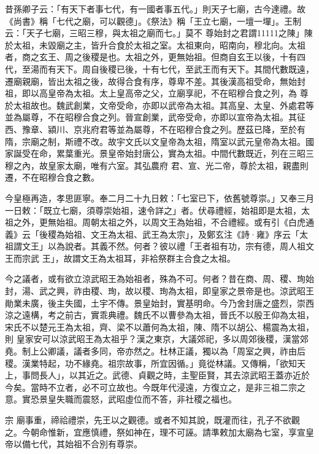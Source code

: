 \begin{pinyinscope}
 昔孫卿子云：「有天下者事七代，有一國者事五代。」則天子七廟，古今達禮。故《尚書》稱「七代之廟，可以觀德」。《祭法》稱「王立七廟，一壇一墠」。王制云：「天子七廟，三昭三穆，與太祖之廟而七。」莫不
 尊始封之君謂11111之陳」陳於太祖，未毀廟之主，皆升合食於太祖之室。太祖東向，昭南向，穆北向。太祖者，商之玄王、周之後稷是也。太祖之外，更無始祖。但商自玄王以後，十有四代，至湯而有天下。周自後稷已後，十有七代，至武王而有天下。其間代數既遠，遷廟親廟，皆出太祖之後，故得合食有序，尊卑不差。其後漢高祖受命，無始封祖，即以高皇帝為太祖。太上皇高帝之父，立廟享祀，不在昭穆合食之列，為
 尊於太祖故也。魏武創業，文帝受命，亦即以武帝為太祖。其高皇、太皇、外處君等並為屬尊，不在昭穆合食之列。晉宣創業，武帝受命，亦即以宣帝為太祖。其征西、豫章、潁川、京兆府君等並為屬尊，不在昭穆合食之列。歷茲已降，至於有隋，宗廟之制，斯禮不改。故宇文氏以文皇帝為太祖，隋室以武元皇帝為太祖。國家誕受在命，累葉重光。景皇帝始封唐公，實為太祖。中間代數既近，列在三昭三穆之內，故皇家太廟，唯有六室。其弘農府
 君、宣、光二帝，尊於太祖，親盡則遷，不在昭穆合食之數。



 今皇極再造，孝思匪寧。奉二月二十九日敕：「七室已下，依舊號尊崇。」又奉三月一日敕：「既立七廟，須尊崇始祖，速令詳之」者。伏尋禮經，始祖即是太祖，太祖之外，更無始祖。周朝太祖之外，以周文王為始祖，不合禮經。或有引《白虎通義》云「後稷為始祖、文王為太祖、武王為太宗」，及鄭玄注《詩·雍》序云「太祖謂文王」以為說者。其義不然。何者？彼以禮「王者祖有功，宗有德，周人祖文王而宗武
 王」，故謂文王為太祖耳，非袷祭群主合食之太祖。



 今之議者，或有欲立涼武昭王為始祖者，殊為不可。何者？昔在商、周、稷、珣始封，湯、武之興，祚由稷、珣，故以稷、珣為太祖，即皇家之景帝是也。涼武昭王勛業未廣，後主失國，土宇不傳。景皇始封，實基明命。今乃舍封唐之盛烈，崇西涼之遠構，考之前古，實乖典禮。魏氏不以曹參為太祖，晉氏不以殷王仰為太祖，宋氏不以楚元王為太祖，齊、梁不以蕭何為太祖，陳、隋不以胡公、楊震為太祖，則
 皇家安可以涼武昭王為太祖乎？漢之東京，大議郊祀，多以周郊後稷，漢當郊堯。制上公卿議，議者多同，帝亦然之。杜林正議，獨以為「周室之興，祚由后稷。漢業特起，功不緣堯。祖宗故事，所宜因循。」竟從林議。又傳稱，「欲知天上，事問長人」，以其近之。武德、貞觀之時，主聖臣賢，其去涼武昭王蓋亦近於今矣。當時不立者，必不可立故也。今既年代浸遠，方復立之，是非三祖二宗之意。實恐景皇失職而震怒，武昭虛位而不答，非社稷之福也。



 宗
 廟事重，禘祫禮崇，先王以之觀德。或者不知其說，既灌而往，孔子不欲觀之。今朝命惟新，宜應慎禮，祭如神在，理不可誣。請準敕加太廟為七室，享宣皇帝以備七代，其始祖不合別有尊崇。




\end{pinyinscope}
